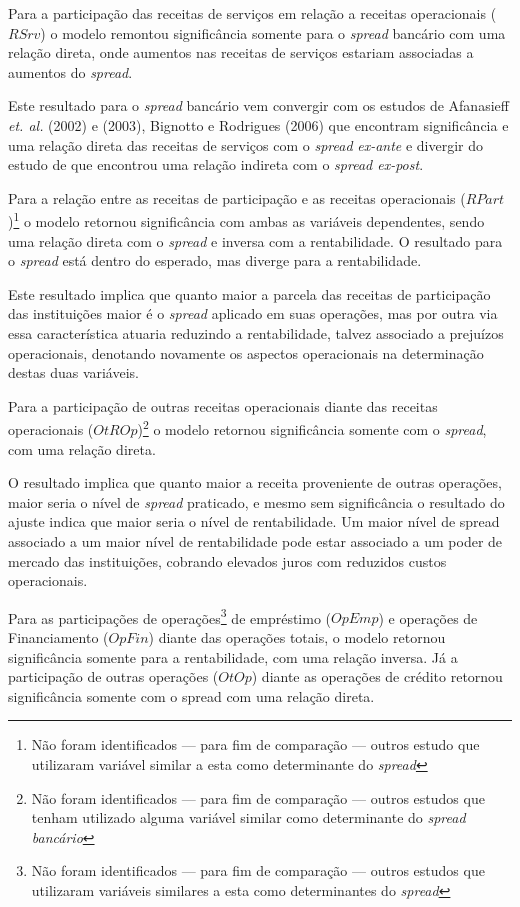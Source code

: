 \documentclass[
  12pt,
  12pt,
  openright,
  oneside,
  a4paper,
  chapter=TITLE,
  section=TITLE,
  subsection=TITLE,
  subsubsection=TITLE,
  portugues,
  sumario=tradicional]{abntex2}
\begin{document}
Para a participação das receitas de serviços em relação a receitas operacionais (\(RSrv\)) o modelo remontou significância somente para o \emph{spread} bancário com uma relação direta, onde aumentos nas receitas de serviços estariam associadas a aumentos do \emph{spread}.

Este resultado para o \emph{spread} bancário vem convergir com os estudos de Afanasieff \emph{et. al.} (2002) e (2003), Bignotto e Rodrigues (2006) que encontram significância e uma relação direta das receitas de serviços com o \emph{spread} \emph{ex-ante} e divergir do estudo de \textcite{almeida:2013} que encontrou uma relação indireta com o \emph{spread ex-post}.

Para a relação entre as receitas de participação e as receitas operacionais (\(RPart\))\footnote{Não foram identificados — para fim de comparação  — outros estudo que utilizaram variável similar a esta como determinante do \emph{spread}} o modelo retornou significância com ambas as variáveis dependentes, sendo uma relação direta com o \emph{spread} e inversa com a rentabilidade. O resultado para o \emph{spread} está dentro do esperado, mas diverge para a rentabilidade.

Este resultado implica que quanto maior a parcela das receitas de participação das instituições maior é o \emph{spread} aplicado em suas operações, mas por outra via essa característica atuaria reduzindo a rentabilidade, talvez associado a prejuízos operacionais, denotando novamente os aspectos operacionais na determinação destas duas variáveis.

Para a participação de outras receitas operacionais diante das receitas operacionais (\(OtROp\))\footnote{Não foram identificados — para fim de comparação — outros estudos que tenham utilizado alguma variável similar como determinante do \emph{spread bancário}} o modelo retornou significância somente com o \emph{spread}, com uma relação direta.

O resultado implica que quanto maior a receita proveniente de outras operações, maior seria o nível de \emph{spread} praticado, e mesmo sem significância o resultado do ajuste indica que maior seria o nível de rentabilidade. Um maior nível de spread associado a um maior nível de rentabilidade pode estar associado a um poder de mercado das instituições, cobrando elevados juros com reduzidos custos operacionais.

Para as participações de operações\footnote{Não foram identificados — para fim de comparação — outros estudos que utilizaram variáveis similares a esta como determinantes do \emph{spread}} de empréstimo (\(OpEmp\)) e operações de Financiamento (\(OpFin\)) diante das operações totais, o modelo retornou significância somente para a rentabilidade, com uma relação inversa. Já a participação de outras operações (\(OtOp\)) diante as operações de crédito retornou significância somente com o spread com uma relação direta.
\end{document}
